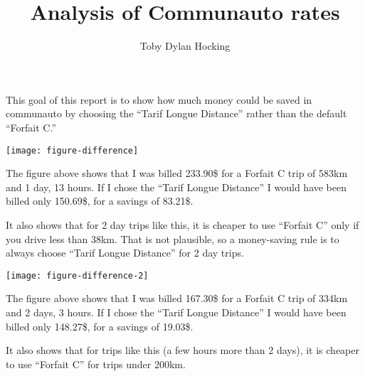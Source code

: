 \documentclass[12pt]{article}
\begin{document}
\title{Analysis of Communauto rates}
\author{Toby Dylan Hocking}

\maketitle

This goal of this report is to show how much money could be saved in
communauto by choosing the ``Tarif Longue Distance'' rather than the
default ``Forfait C.''

\texttt{[image: figure-difference]}

The figure above shows that I was billed 233.90\$ for a Forfait C trip
of 583km and 1 day, 13 hours. If I chose the ``Tarif Longue Distance''
I would have been billed only 150.69\$, for a savings of 83.21\$.

It also shows that for 2 day trips like this, it is cheaper to use
``Forfait C'' only if you drive less than 38km. That is not plausible,
so a money-saving rule is to always choose ``Tarif Longue Distance''
for 2 day trips.

\texttt{[image: figure-difference-2]}

The figure above shows that I was billed 167.30\$ for a Forfait C trip
of 334km and 2 days, 3 hours. If I chose the ``Tarif Longue Distance''
I would have been billed only 148.27\$, for a savings of 19.03\$.

It also shows that for trips like this (a few hours more than 2 days),
it is cheaper to use ``Forfait C'' for trips under 200km.
\end{document}
